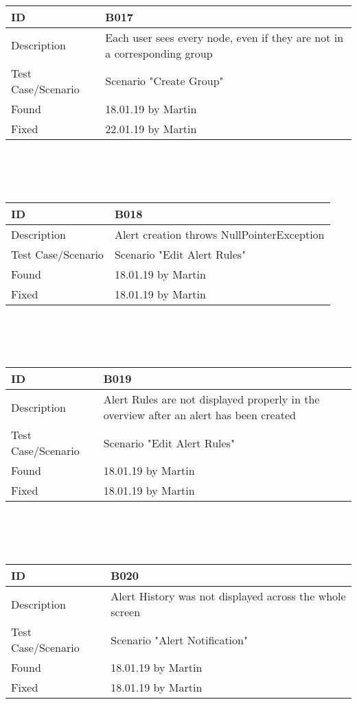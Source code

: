 \documentclass{scrreprt}
\begin{document}
\\ \\ \\
\begin{tabularx}{12cm}{l|X}
ID					& B017  \\
\hline
Description 		& 
Each user sees every node, even if they are not in a corresponding group\\
\hline
Test Case/Scenario	& Scenario "Create Group"  \\
\hline
Found				& 18.01.19 by Martin \\
\hline
Fixed				& 22.01.19 by Martin\\ 
\end{tabularx}
\\ \\ \\
\begin{tabularx}{12cm}{l|X}
ID					& B018  \\
\hline
Description 		& 
Alert creation throws NullPointerException\\
\hline
Test Case/Scenario	& Scenario "Edit Alert Rules" \\
\hline
Found				& 18.01.19 by Martin  \\
\hline
Fixed				& 18.01.19 by Martin \\ 
\end{tabularx}
\\ \\ \\
\begin{tabularx}{12cm}{l|X}
ID					& B019  \\
\hline
Description 		& 
Alert Rules are not displayed properly in the overview after an alert has been created\\
\hline
Test Case/Scenario	& Scenario "Edit Alert Rules" \\
\hline
Found				& 18.01.19 by Martin  \\
\hline
Fixed				& 18.01.19 by Martin \\ 
\end{tabularx}
\\ \\ \\
\begin{tabularx}{12cm}{l|X}
ID					& B020  \\
\hline
Description 		& 
Alert History was not displayed across the whole screen\\
\hline
Test Case/Scenario	& Scenario "Alert Notification" \\
\hline
Found				& 18.01.19 by Martin  \\
\hline
Fixed				& 18.01.19 by Martin \\ 
\end{tabularx}
\end{document}
